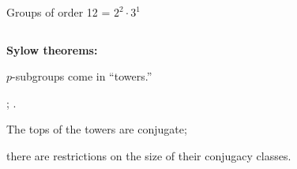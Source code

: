 \documentclass[8pt, handout]{beamer}
\begin{document}

\begin{frame}{Groups of order 12 = $2^2 \cdot 3^1$} %

  \vspace{5mm}

  \begin{columns}
    \begin{column}{.5\textwidth}
      \textbf{Sylow theorems:} \bigskip

      $p$-subgroups come in ``towers.'' \bigskip

      ; . \bigskip

      The tops of the towers are conjugate;

      there are restrictions on the size of their conjugacy classes.
    \end{column}
    \begin{column}{.45\textwidth}
    \end{column}
  \end{columns}
  
  
  \vspace{-40mm}


\end{frame}
\end{document}
